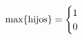 \documentclass[preview]{standalone}
\begin{document}
\begin{align*}
\text{max\{hijos\}} = \begin{cases}1 \cr 0 \cr \end{cases}
\end{align*}
\end{document}
